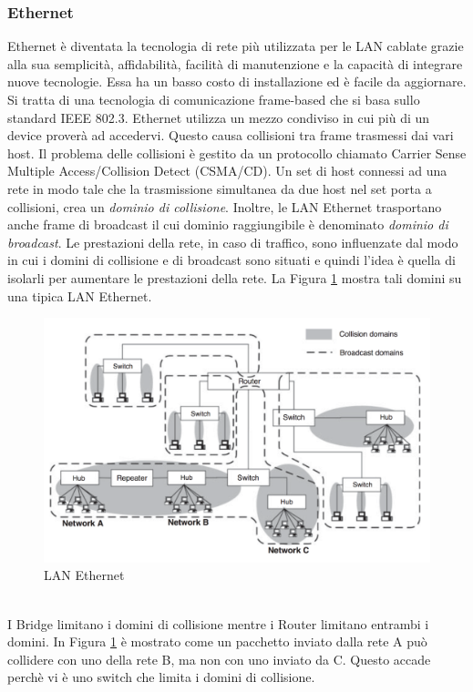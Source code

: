 \subsubsection{Ethernet}
Ethernet è diventata la tecnologia di rete più utilizzata per le LAN cablate grazie alla sua semplicità, affidabilità, facilità di manutenzione e la capacità di integrare nuove tecnologie. Essa ha un basso costo di installazione ed è facile da aggiornare. Si tratta di una tecnologia di comunicazione frame-based che si basa sullo standard IEEE 802.3. 
Ethernet utilizza un mezzo condiviso in cui più di un device proverà ad accedervi. Questo causa collisioni tra frame trasmessi dai vari host. Il problema delle collisioni è gestito da un protocollo chiamato Carrier Sense Multiple Access/Collision Detect (CSMA/CD). Un set di host connessi ad una rete in modo tale che la trasmissione simultanea da due host nel set porta a collisioni, crea un \emph{dominio di collisione}. Inoltre, le LAN Ethernet trasportano anche frame di broadcast il cui dominio raggiungibile è denominato \emph{dominio di broadcast}. Le prestazioni della rete, in caso di traffico, sono influenzate dal modo in cui i domini di collisione e di broadcast sono situati e quindi l'idea è quella di isolarli per aumentare le prestazioni della rete.\newpage
La Figura \ref{fig:lan} mostra tali domini su una tipica LAN Ethernet.
\begin{figure}[h]
	\centering
	\includegraphics[scale=0.340]{imgs/lan.png}
	\caption{LAN Ethernet} \label{fig:lan}
\end{figure}
\\I Bridge limitano i domini di collisione mentre i Router limitano entrambi i domini. In Figura \ref{fig:lan} è mostrato come un pacchetto inviato dalla rete A può collidere con uno della rete B, ma non con uno inviato da C. Questo accade perchè vi è uno switch che limita i domini di collisione.
